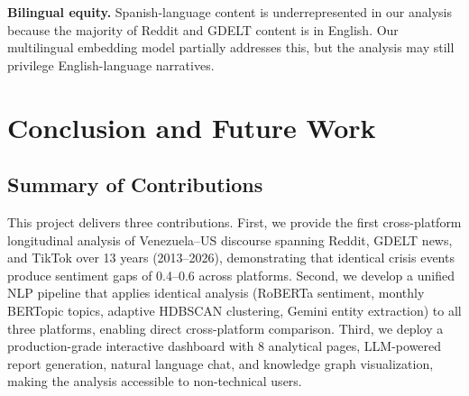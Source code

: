 \documentclass[12pt, letterpaper]{article}
\begin{document}
\textbf{Bilingual equity.} Spanish-language content is underrepresented in our analysis because the majority of Reddit and GDELT content is in English. Our multilingual embedding model partially addresses this, but the analysis may still privilege English-language narratives.

\section{Conclusion and Future Work}
\label{sec:conclusion}

\subsection{Summary of Contributions}

This project delivers three contributions. First, we provide the first cross-platform longitudinal analysis of Venezuela--US discourse spanning Reddit, GDELT news, and TikTok over 13 years (2013--2026), demonstrating that identical crisis events produce sentiment gaps of 0.4--0.6 across platforms. Second, we develop a unified NLP pipeline that applies identical analysis (RoBERTa sentiment, monthly BERTopic topics, adaptive HDBSCAN clustering, Gemini entity extraction) to all three platforms, enabling direct cross-platform comparison. Third, we deploy a production-grade interactive dashboard with 8 analytical pages, LLM-powered report generation, natural language chat, and knowledge graph visualization, making the analysis accessible to non-technical users.
\end{document}
